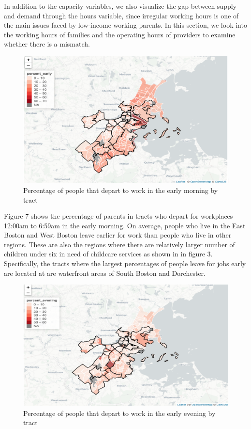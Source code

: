 \documentclass[10pt,letterpaper]{article}
\begin{document}
In addition to the capacity variables, we also visualize the gap between
supply and demand through the hours variable, since irregular working
hours is one of the main issues faced by low-income working parents. In
this section, we look into the working hours of families and the
operating hours of providers to examine whether there is a mismatch.

\begin{figure}

{\centering \includegraphics[width=1\linewidth]{fig4} 

}

\caption{Percentage of people that depart to work in the early morning by tract}\label{fig:unnamed-chunk-7}
\end{figure}

Figure 7 shows the percentage of parents in tracts who depart for
workplaces 12:00am to 6:59am in the early morning. On average, people
who live in the East Boston and West Boston leave earlier for work than
people who live in other regions. These are also the regions where there
are relatively larger number of children under six in need of childcare
services as shown in in figure 3. Specifically, the tracts where the
largest percentages of people leave for jobs early are located at are
waterfront areas of South Boston and Dorchester.

\begin{figure}

{\centering \includegraphics[width=1\linewidth]{fig5} 

}

\caption{Percentage of people that depart to work in the early evening by tract}\label{fig:unnamed-chunk-8}
\end{figure}
\end{document}
